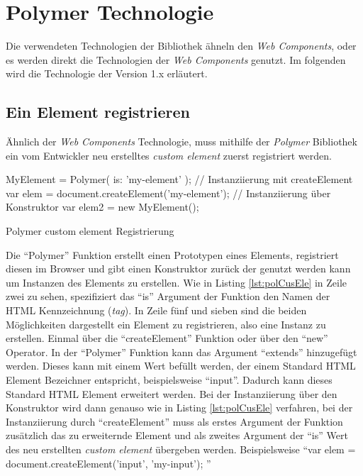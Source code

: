 \documentclass[12pt, paper=a4, bibtotoc, toc=listof, headsepline=true]{scrreprt}
\begin{document}
	\section{Polymer Technologie} Die verwendeten Technologien der Bibliothek ähneln den \emph{Web Components}, oder es werden direkt die Technologien der \emph{Web Components} genutzt. Im folgenden wird die Technologie der Version 1.x erläutert.
		\subsection{Ein Element registrieren}
		Ähnlich der \emph{Web Components} Technologie, muss mithilfe der \emph{Polymer} Bibliothek ein vom Entwickler neu erstelltes \emph{custom element} zuerst registriert werden. 
		\begin{listing}
		\begin{JavaScriptcode*}{}
	MyElement = Polymer({
	   is: 'my-element'
	});
	// Instanziierung mit createElement
	var elem = document.createElement('my-element');
	// Instanziierung über Konstruktor
	var elem2 = new MyElement();
		\end{JavaScriptcode*}
		\caption{Polymer custom element Registrierung}
		\label{lst:polCusEle}
		\end{listing}
Die \enquote{Polymer} Funktion erstellt einen Prototypen eines Elements, registriert diesen im Browser und gibt einen Konstruktor zurück der genutzt werden kann um Instanzen des Elements zu erstellen. Wie in Listing \ref{lst:polCusEle} in Zeile zwei zu sehen, spezifiziert das \enquote{is} Argument der Funktion den Namen der \ac{HTML} Kennzeichnung (\emph{tag}). In Zeile fünf und sieben sind die beiden Möglichkeiten dargestellt ein Element zu registrieren, also eine Instanz zu erstellen. Einmal über die \enquote{createElement} Funktion oder über den \enquote{new} Operator. In der \enquote{Polymer} Funktion kann das Argument \enquote{extends} hinzugefügt werden. Dieses kann mit einem Wert befüllt werden, der einem Standard \ac{HTML} Element Bezeichner entspricht, beispielsweise \enquote{input}. Dadurch kann dieses Standard \ac{HTML} Element erweitert werden. Bei der Instanziierung über den Konstruktor wird dann genauso wie in Listing \ref{lst:polCusEle} verfahren, bei der Instanziierung durch \enquote{createElement} muss als erstes Argument der Funktion zusätzlich das zu erweiternde Element und als zweites Argument der \enquote{is} Wert des neu erstellten \emph{custom element} übergeben werden. Beispielsweise \enquote{var elem = document.createElement('input', 'my-input');
}\cite{polyReg}
\newpage
\end{document}

